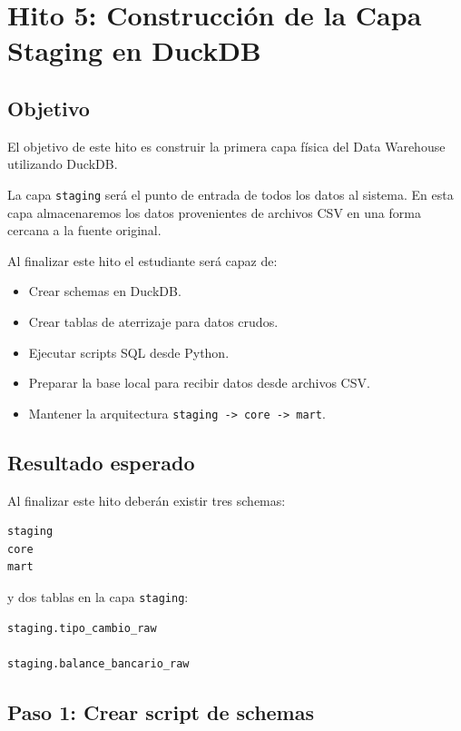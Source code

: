 \chapter{Hito 5: Construcción de la Capa Staging en DuckDB}

\section{Objetivo}

El objetivo de este hito es construir la primera capa física del Data Warehouse utilizando DuckDB.

La capa \texttt{staging} será el punto de entrada de todos los datos al sistema. En esta capa almacenaremos los datos provenientes de archivos CSV en una forma cercana a la fuente original.

Al finalizar este hito el estudiante será capaz de:

\begin{itemize}
\item Crear schemas en DuckDB.
\item Crear tablas de aterrizaje para datos crudos.
\item Ejecutar scripts SQL desde Python.
\item Preparar la base local para recibir datos desde archivos CSV.
\item Mantener la arquitectura \texttt{staging -> core -> mart}.
\end{itemize}

\section{Resultado esperado}

Al finalizar este hito deberán existir tres schemas:

\begin{verbatim}
staging
core
mart
\end{verbatim}

y dos tablas en la capa \texttt{staging}:

\begin{verbatim}
staging.tipo_cambio_raw

staging.balance_bancario_raw
\end{verbatim}

\section{Paso 1: Crear script de schemas}


